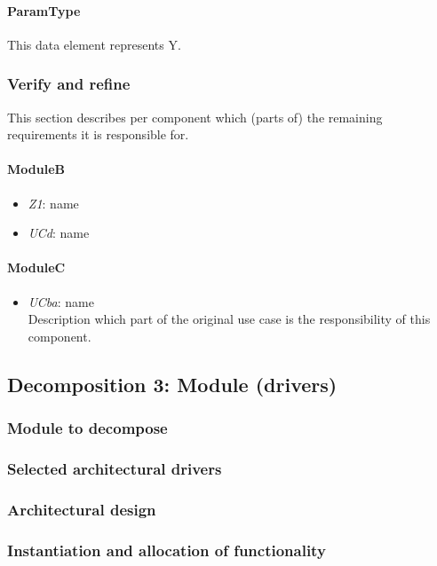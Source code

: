 \documentclass[a4paper,10pt]{article}
\begin{document}
\paragraph{ParamType} This data element represents Y.

\subsubsection{Verify and refine}
This section describes per component which (parts of) the remaining
requirements it is responsible for.

\paragraph{ModuleB}
\begin{itemize}
	\item \emph{Z1}: name
	\item \emph{UCd}: name
\end{itemize}

\paragraph{ModuleC}
\begin{itemize}
	\item \emph{UCba}: name\\Description which part of the original use case is
	the responsibility of this component.
\end{itemize}

\subsection{Decomposition 3: Module (drivers)}
\subsubsection{Module to decompose}
\subsubsection{Selected architectural drivers}
\subsubsection{Architectural design}
\subsubsection{Instantiation and allocation of functionality}
\end{document}
